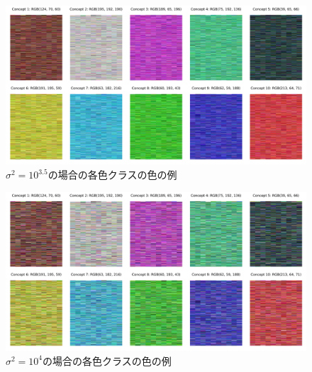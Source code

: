 \begin{figure}[H]
    \centering
    \includegraphics[width=\linewidth]{fig/color_varinace/3612.pdf}
    \caption{$\sigma^2 = 10^{3.5}$の場合の各色クラスの色の例}
    \label{fig:variance_3612}
\end{figure}

\begin{figure}[H]
    \centering
    \includegraphics[width=\linewidth]{fig/color_varinace/10000.pdf}
    \caption{$\sigma^2 = 10^4$の場合の各色クラスの色の例}
    \label{fig:variance_10000}
\end{figure}

